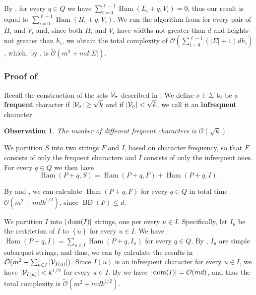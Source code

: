 \documentclass[11pt]{article}
\renewcommand{\O}{\mathcal{O}}
\newcommand{\tO}{\tilde{\mathcal{O}}}
\newcommand{\set}[1]{\left\lbrace #1 \right\rbrace}
\theoremstyle{plain}
\newtheorem{observation}{Observation}
\theoremstyle{definition}
\theoremstyle{remark}
\DeclareMathOperator*{\Ham}{Ham}
\DeclareMathOperator*{\BD}{BD}
\begin{document}
By , for every $q \in Q$ we have $\sum_{i = 0}^{\ell - 1} \Ham(L_i + q, V_i) = 0$, thus our result is equal to $\sum_{i = 0}^{\ell - 1} \Ham(H_i + q, V_i)$.
We run the algorithm from  for every pair of $H_i$ and $V_i$ and, since both $H_i$ and $V_i$ have widths not greater than $d$ and heights not greater than $h_i$, we obtain the total complexity of $\tO(\sum_{i = 0}^{\ell - 1} (|\Sigma| + 1)dh_i)$, 
which, by , is $\tO(m^2 + md|\Sigma|)$.

\subsubsection{Proof of } \label{dense_algo_proof}

Recall the construction of the sets $\mathcal{V}_\sigma$ described in .
We define $\sigma \in \Sigma$ to be a \textbf{frequent} character if $|\mathcal{V}_\sigma| \ge \sqrt{k}$ and if $|\mathcal{V}_\sigma| < \sqrt{k}$, we call it an \textbf{infrequent} character.
\begin{observation}\label{frequent_character_bound}
	The number of different frequent characters is $\O(\sqrt{k})$.
\end{observation}


We partition $S$ into two strings $F$ and $I$, based on character frequency,
so that $F$ consists of only the frequent characters and $I$ consists of only the infrequent ones.
For every $q \in Q$ we then have 
$$\Ham(P + q, S) = \Ham(P + q, F) + \Ham(P + q, I).$$

By  and , we can calculate $\Ham(P + q, F)$ for every $q \in Q$ in total time $\tO(m^2 + mdk^{1/2})$, since $\BD(F) \le d$. 

We partition $I$ into $|\operatorname*{dom}(I)|$ strings, one per every $u \in I$.
Specifically, let $I_u$ be the restriction of $I$ to $\set{u}$ for every $u \in I$.
We have $\Ham(P + q, I) = \sum_{u \in I} \Ham(P + q, I_u)$ for every $q \in Q$.
By , $I_u$ are simple subarquet strings, and thus, we can by  calculate the results in $\tO(m^2 + \sum_{u \in I} |\V_{I(u)}|)$.
Since $I(u)$ is an infrequent character for every $u \in I$, we have $|\mathcal{V}_{I(u)}| < k^{1/2}$ for every $u \in I$.
By  we have $|\d{I}| = \O(md)$, and thus the total complexity is $\tO(m^2 + mdk^{1/2})$.

\end{document}
